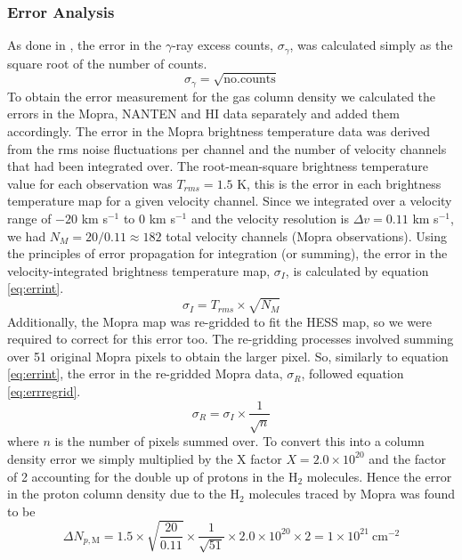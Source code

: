 \documentclass[12pt,a4paper]{article}
\begin{document}
\subsubsection{Error Analysis}
As done in \cite{2012ApJ...746...82F}, the error in the $\gamma$-ray excess counts, $\sigma_{\gamma}$, was calculated simply as the square root of the number of counts. 
\begin{equation}
\label{eq:errgamma}
\sigma_{\gamma} = \sqrt{\mathrm{no. counts}} 
\end{equation}
To obtain the error measurement for the gas column density we calculated the errors in the Mopra, NANTEN and HI data separately and added them accordingly. The error in the Mopra brightness temperature data was derived from the rms noise fluctuations per channel and the number of velocity channels that had been integrated over. The root-mean-square brightness temperature value for each observation was $T_{rms} = 1.5$ K, this is the error in each brightness temperature map for a given velocity channel. Since we integrated over a velocity range of $-20$ km s$^{-1}$ to 0 km s$^{-1}$ and the velocity resolution is $\Delta v = 0.11 $ km s$^{-1}$, we had $N_M = 20 / 0.11 \approx 182 $ total velocity channels (Mopra observations). Using the principles of error propagation for integration (or summing), the error in the velocity-integrated brightness temperature map, $\sigma_I$, is calculated by equation \ref{eq:errint}.
\begin{equation}
\label{eq:errint}
\sigma_I = T_{rms} \times \sqrt{N_M}
\end{equation}
Additionally, the Mopra map was re-gridded to fit the HESS map, so we were required to correct for this error too. The re-gridding processes involved summing over 51 original Mopra pixels to obtain the larger pixel. So, similarly to equation \ref{eq:errint}, the error in the re-gridded Mopra data, $\sigma_R$, followed equation \ref{eq:errregrid}.
\begin{equation}
\label{eq:errregrid}
\sigma_R = \sigma_I \times \dfrac{1}{\sqrt{n}}
\end{equation}
where $n$ is the number of pixels summed over. To convert this into a column density error we simply multiplied by the X factor $X = 2.0 \times 10^{20}$ and the factor of 2 accounting for the double up of protons in the H$_2$ molecules. Hence the error in the proton column density due to the H$_2$ molecules traced by Mopra was found to be
\begin{equation}
\Delta N_{p,\mathrm{M}} = 1.5 \times \sqrt{\dfrac{20}{0.11}} \times \dfrac{1}{\sqrt{51}} \times 2.0 \times 10^{20} \times 2 = 1 \times 10^{21} \ \mathrm{cm}^{-2}
\end{equation}
\end{document}
